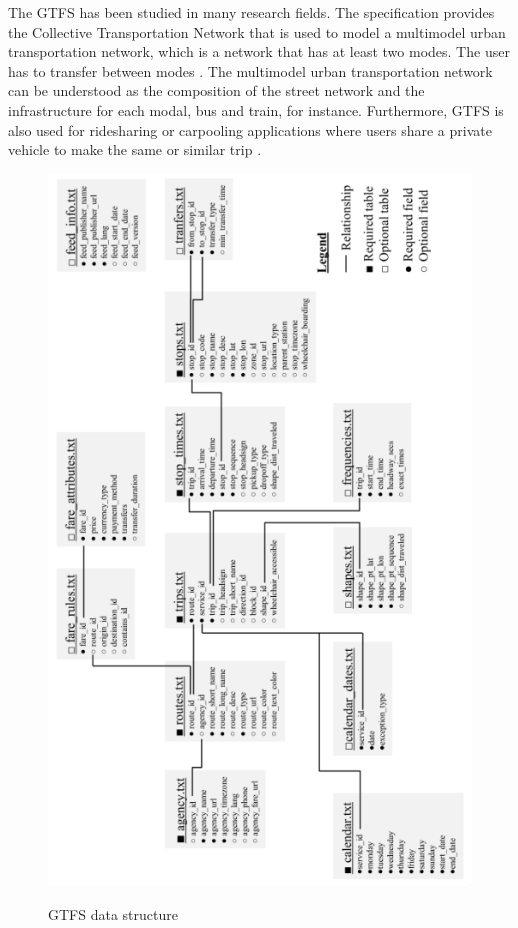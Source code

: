 The GTFS has been studied in many research fields. The specification provides
the Collective Transportation Network that is used to model a multimodel urban
transportation network, which is a network that has at least two modes. The user
has to transfer between modes \cite{gtfsexemple3}. The multimodel urban 
transportation network can be understood as the composition of the street network
and the infrastructure for each modal, bus and train, for instance. Furthermore,
GTFS is also used for ridesharing or carpooling applications where 
users share a private vehicle to make the same or similar trip \cite{GTFSExemples}.


\begin{figure}[t]
     \centering
        \caption{GTFS data structure}
        \includegraphics[scale=0.50, angle=270]{imagem/cap2/gtfs_wong.png}
        \label{img:2:1}
    \end{figure}
